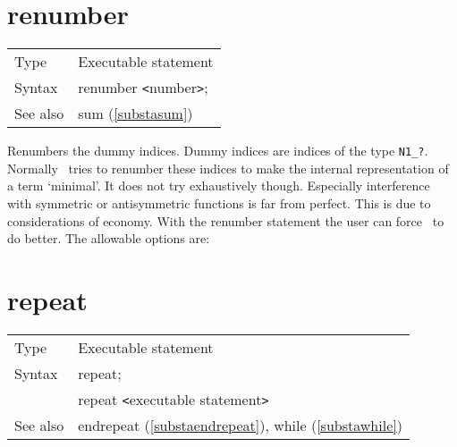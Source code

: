 
\section{renumber}
\label{substarenumber}

\noindent \begin{tabular}{ll}
Type & Executable statement\\
Syntax & renumber {\tt<}number{\tt>};
\\ See also & sum (\ref{substasum})
\end{tabular}\vspace{4mm}

\noindent Renumbers the dummy 
indices. Dummy indices are indices of the type 
\verb:N1_?:. Normally \FORM\ tries to renumber these indices to make the 
internal representation of a term `minimal'. It does not try exhaustively 
though. Especially interference with symmetric or antisymmetric functions 
is far from perfect. This is due to considerations of economy. With the 
renumber statement the user can force \FORM\ to do better. The allowable 
options are:


\vspace{10mm}


\section{repeat}
\label{substarepeat}

\noindent \begin{tabular}{ll}
Type & Executable statement\\
Syntax & repeat; \\
       & repeat {\tt<}executable statement{\tt>}
\\ See also & endrepeat (\ref{substaendrepeat}), while (\ref{substawhile})
\end{tabular} \vspace{4mm}

